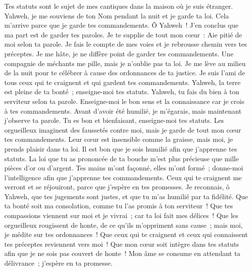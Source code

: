 \begin{multicols}{2}
Tes statuts sont le sujet de mes cantiques dans la maison où je suis étranger.
Yahweh, je me souviens de ton Nom pendant la nuit et je garde ta loi.
Cela m'arrive parce que je garde tes commandements.
 Ô Yahweh~! J'en conclus que ma part est de garder tes paroles.
Je te supplie de tout mon cœur~: Aie pitié de moi selon ta parole.
Je fais le compte de mes voies et je rebrousse chemin vers tes préceptes.
Je me hâte, je ne diffère point de garder tes commandements.
Une compagnie de méchants me pille, mais je n'oublie pas ta loi.
Je me lève au milieu de la nuit pour te célébrer à cause des ordonnances de ta justice.
Je suis l'ami de tous ceux qui te craignent et qui gardent tes commandements.
Yahweh, la terre est pleine de ta bonté~; enseigne-moi tes statuts.
 Yahweh, tu fais du bien à ton serviteur selon ta parole.
Enseigne-moi le bon sens et la connaissance car je crois à tes commandements.
Avant d'avoir été humilié, je m'égarais, mais maintenant j'observe ta parole.
Tu es bon et bienfaisant, enseigne-moi tes statuts.
Les orgueilleux imaginent des faussetés contre moi, mais je garde de tout mon cœur tes commandements.
Leur cœur est insensible comme la graisse, mais moi, je prends plaisir dans ta loi.
Il est bon que je sois humilié afin que j'apprenne tes statuts.
La loi que tu as prononcée de ta bouche m'est plus précieuse que mille pièces d'or ou d'argent.
 Tes mains m'ont façonné, elles m'ont formé~; donne-moi l'intelligence afin que j'apprenne tes commandements.
Ceux qui te craignent me verront et se réjouiront, parce que j'espère en tes promesses.
Je reconnais, ô Yahweh, que tes jugements sont justes, et que tu m'as humilié par ta fidélité.
Que ta bonté soit ma consolation, comme tu l'as promis à ton serviteur~!
Que tes compassions viennent sur moi et je vivrai~; car ta loi fait mes délices~!
Que les orgueilleux rougissent de honte, de ce qu'ils m'oppriment sans cause~; mais moi, je médite sur tes ordonnances~!
Que ceux qui te craignent et ceux qui connaissent tes préceptes reviennent vers moi~!
Que mon cœur soit intègre dans tes statuts afin que je ne sois pas couvert de honte~!
 Mon âme se consume en attendant ta délivrance~; j'espère en ta promesse.

\end{multicols}
